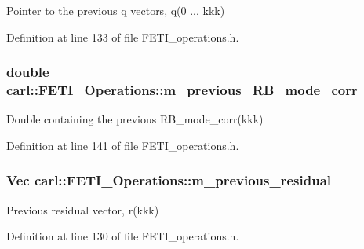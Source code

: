 Pointer to the previous {\ttfamily q} vectors, {\ttfamily q(0 ... kkk)} 



Definition at line 133 of file F\+E\+T\+I\+\_\+operations.\+h.

\hypertarget{classcarl_1_1_f_e_t_i___operations_ae13cf11dfb8dd3a55742b06d96e0e941}{}
\subsubsection[{m\+\_\+previous\+\_\+\+R\+B\+\_\+mode\+\_\+corr}]{\setlength{\rightskip}{0pt plus 5cm}double carl\+::\+F\+E\+T\+I\+\_\+\+Operations\+::m\+\_\+previous\+\_\+\+R\+B\+\_\+mode\+\_\+corr\hspace{0.3cm}{\ttfamily [protected]}}\label{classcarl_1_1_f_e_t_i___operations_ae13cf11dfb8dd3a55742b06d96e0e941}


Double containing the previous {\ttfamily R\+B\+\_\+mode\+\_\+corr(kkk)} 



Definition at line 141 of file F\+E\+T\+I\+\_\+operations.\+h.

\hypertarget{classcarl_1_1_f_e_t_i___operations_a3097f0040b5f00a717883840c95ca7e6}{}
\subsubsection[{m\+\_\+previous\+\_\+residual}]{\setlength{\rightskip}{0pt plus 5cm}Vec carl\+::\+F\+E\+T\+I\+\_\+\+Operations\+::m\+\_\+previous\+\_\+residual\hspace{0.3cm}{\ttfamily [protected]}}\label{classcarl_1_1_f_e_t_i___operations_a3097f0040b5f00a717883840c95ca7e6}


Previous residual vector, {\ttfamily r(kkk)} 



Definition at line 130 of file F\+E\+T\+I\+\_\+operations.\+h.

